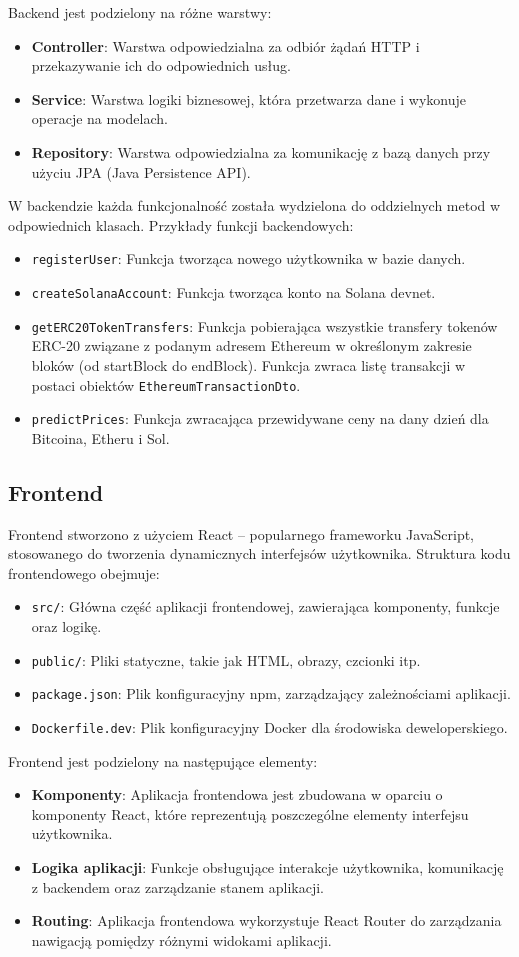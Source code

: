 \noindent Backend jest podzielony na różne warstwy:
\begin{itemize}
    \item \textbf{Controller}: Warstwa odpowiedzialna za odbiór żądań HTTP i przekazywanie ich do odpowiednich usług.
    \item \textbf{Service}: Warstwa logiki biznesowej, która przetwarza dane i wykonuje operacje na modelach.
    \item \textbf{Repository}: Warstwa odpowiedzialna za komunikację z bazą danych przy użyciu JPA (Java Persistence API).
\end{itemize}
W backendzie każda funkcjonalność została wydzielona do oddzielnych metod w odpowiednich klasach. Przykłady funkcji backendowych:
\begin{itemize}
    \item \texttt{registerUser}: Funkcja tworząca nowego użytkownika w bazie danych.
    \item \texttt{createSolanaAccount}: Funkcja tworząca konto na Solana devnet.
    \item \texttt{getERC20TokenTransfers}: Funkcja pobierająca wszystkie transfery tokenów ERC-20 związane z podanym adresem Ethereum w określonym zakresie bloków (od startBlock do endBlock). Funkcja zwraca listę transakcji w postaci obiektów \texttt{EthereumTransactionDto}.
		\item \texttt{predictPrices}: Funkcja zwracająca przewidywane ceny na dany dzień dla Bitcoina, Etheru i Sol.
\end{itemize}


\subsection{Frontend}
Frontend stworzono z użyciem React -- popularnego frameworku JavaScript, stosowanego do tworzenia dynamicznych interfejsów użytkownika. Struktura kodu frontendowego obejmuje:
\begin{itemize}
    \item \texttt{src/}: Główna część aplikacji frontendowej, zawierająca komponenty, funkcje oraz logikę.
    \item \texttt{public/}: Pliki statyczne, takie jak HTML, obrazy, czcionki itp.
    \item \texttt{package.json}: Plik konfiguracyjny npm, zarządzający zależnościami aplikacji.
    \item \texttt{Dockerfile.dev}: Plik konfiguracyjny Docker dla środowiska deweloperskiego.
\end{itemize}
Frontend jest podzielony na następujące elementy:
\begin{itemize}
    \item \textbf{Komponenty}: Aplikacja frontendowa jest zbudowana w oparciu o komponenty React, które reprezentują poszczególne elementy interfejsu użytkownika.
    \item \textbf{Logika aplikacji}: Funkcje obsługujące interakcje użytkownika, komunikację z backendem oraz zarządzanie stanem aplikacji.
    \item \textbf{Routing}: Aplikacja frontendowa wykorzystuje React Router do zarządzania nawigacją pomiędzy różnymi widokami aplikacji.
\end{itemize}



